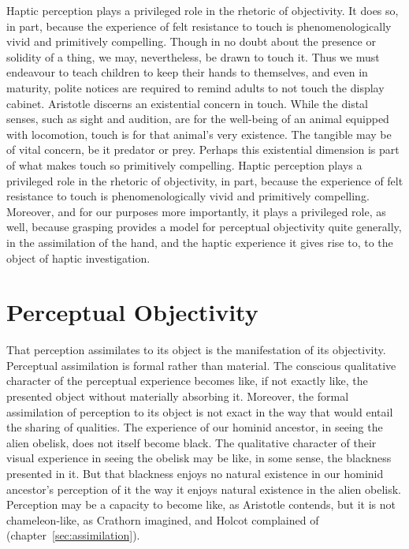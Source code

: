 Haptic perception plays a privileged role in the rhetoric of objectivity. It does so, in part, because the experience of felt resistance to touch is phenomenologically vivid and primitively compelling. Though in no doubt about the presence or solidity of a thing, we may, nevertheless, be drawn to touch it. Thus we must endeavour to teach children to keep their hands to themselves, and even in maturity, polite notices are required to remind adults to not touch the display cabinet. Aristotle discerns an existential concern in touch. While the distal senses, such as sight and audition, are for the well-being of an animal equipped with locomotion, touch is for that animal's very existence. The tangible may be of vital concern, be it predator or prey. Perhaps this existential dimension is part of what makes touch so primitively compelling. Haptic perception plays a privileged role in the rhetoric of objectivity, in part, because the experience of felt resistance to touch is phenomenologically vivid and primitively compelling. Moreover, and for our purposes more importantly, it plays a privileged role, as well, because grasping provides a model for perceptual objectivity quite generally, in the assimilation of the hand, and the haptic experience it gives rise to, to the object of haptic investigation.


\section{Perceptual Objectivity} %
\label{sec:perceptual_objectivity}

That perception assimilates to its object is the manifestation of its objectivity. Perceptual assimilation is formal rather than material. The conscious qualitative character of the perceptual experience becomes like, if not exactly like, the presented object without materially absorbing it. Moreover, the formal assimilation of perception to its object is not exact in the way that would entail the sharing of qualities. The experience of our hominid ancestor, in seeing the alien obelisk, does not itself become black. The qualitative character of their visual experience in seeing the obelisk may be like, in some sense, the blackness presented in it. But that blackness enjoys no natural existence in our hominid ancestor's perception of it the way it enjoys natural existence in the alien obelisk. Perception may be a capacity to become like, as Aristotle contends, but it is not chameleon-like, as Crathorn imagined, and Holcot complained of (chapter~\ref{sec:assimilation}). 

